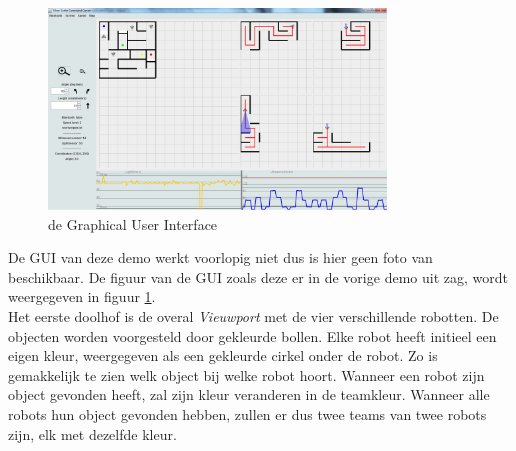 \documentclass[tt2]{penoverslag}
\begin{document}
\begin{figure}[h]
\centering
	\includegraphics[width=0.8\textwidth]{GUInew}
\caption{de Graphical User Interface}
\label{fig:GUI}
\end{figure}

De GUI van deze demo werkt voorlopig niet dus is hier geen foto van beschikbaar. De figuur van de GUI zoals deze er in de vorige demo uit zag, wordt weergegeven in figuur \ref{fig:GUI}.\\

Het eerste doolhof is de overal \textit{Vieuwport} met de vier verschillende robotten.  De objecten worden voorgesteld door gekleurde bollen. Elke robot heeft initieel een eigen kleur, weergegeven als een gekleurde cirkel onder de robot. Zo is gemakkelijk te zien welk object bij welke robot hoort. Wanneer een robot zijn object gevonden heeft, zal zijn kleur veranderen in de teamkleur. Wanneer alle robots hun object gevonden hebben, zullen er dus twee teams van twee robots zijn, elk met dezelfde kleur.


\end{document}

